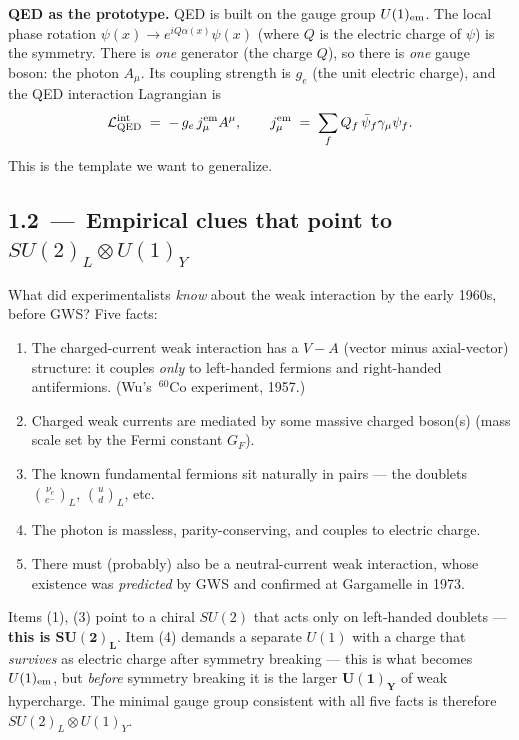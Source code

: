 \documentclass[11pt]{article}
\begin{document}
\textbf{QED as the prototype.} QED is built on the gauge group $U(1)_{\rm em}$. The local
phase rotation $\psi(x) \to e^{i Q \alpha(x)} \psi(x)$ (where $Q$ is the electric charge of
$\psi$) is the symmetry. There is \emph{one} generator (the charge $Q$), so there is
\emph{one} gauge boson: the photon $A_\mu$. Its coupling strength is $g_e$ (the unit
electric charge), and the QED interaction Lagrangian is
\begin{equation}
\mathcal{L}_{\rm QED}^{\rm int} \;=\; -\,g_e\, j^{\rm em}_\mu A^\mu,
\qquad
j^{\rm em}_\mu \;=\; \sum_f Q_f \,\bar\psi_f \gamma_\mu \psi_f .
\end{equation}
This is the template we want to generalize.

\subsection*{1.2 \,---\, Empirical clues that point to $SU(2)_L \otimes U(1)_Y$}

\begin{insightbox}
What did experimentalists \emph{know} about the weak interaction by the early 1960s, before
GWS? Five facts:
\begin{enumerate}[leftmargin=*]
  \item The charged-current weak interaction has a $V-A$ (vector minus axial-vector) structure:
        it couples \emph{only} to left-handed fermions and right-handed antifermions.
        (Wu's $\,^{60}$Co experiment, 1957.)
  \item Charged weak currents are mediated by some massive charged boson(s) (mass scale set
        by the Fermi constant $G_F$).
  \item The known fundamental fermions sit naturally in pairs --- the doublets
        $\binom{\nu_e}{e^-}_L$, $\binom{u}{d}_L$, etc.
  \item The photon is massless, parity-conserving, and couples to electric charge.
  \item There must (probably) also be a neutral-current weak interaction, whose existence
        was \emph{predicted} by GWS and confirmed at Gargamelle in 1973.
\end{enumerate}
Items (1), (3) point to a chiral $SU(2)$ that acts only on left-handed doublets ---
\textbf{this is $\bm{SU(2)_L}$}. Item (4) demands a separate $U(1)$ with a charge that
\emph{survives} as electric charge after symmetry breaking --- this is what becomes
$U(1)_{\rm em}$, but \emph{before} symmetry breaking it is the larger $\bm{U(1)_Y}$ of weak
hypercharge. The minimal gauge group consistent with all five facts is therefore
$SU(2)_L \otimes U(1)_Y$.
\end{insightbox}
\end{document}
